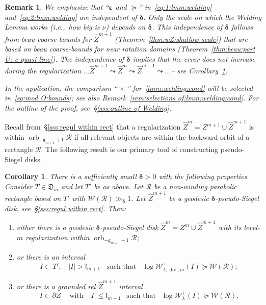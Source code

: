 \documentclass{amsart}
\renewcommand{\sp}{{\ \ }}
\newcommand{\1}{{\mathbb 1 }}
\renewcommand{\div}{{\operatorname{div}}}
\newcommand{\Width}{{\mathcal W}}
\newcommand\RR{\mathcal{R}}
\newcommand{\wZ}{{\widehat Z}}
\newcommand{\qq}{\mathfrak{q}}
\newcommand{\length}{{\mathfrak l}}
\newcommand{\Dbb}{{\mathfrak{D}}}
\newtheorem{cor}[thm]{Corollary}
\newtheorem{rem}[thm]{Remark}
\theoremstyle{remark}
\numberwithin{equation}{section}
\theoremstyle{definition}
\newcommand{\orb}{\operatorname{orb}}
\newcommand{\bdelta}{{\boldsymbol{ \delta}}}
\newcommand{\bvarepsilon}{{\boldsymbol{ \varepsilon}}}
\begin{document}
\begin{rem}
\label{rem:error does not accum}
We emphasize that ``$\bvarepsilon$ and $\succeq$'' in~\eqref{eq:1:lmm:welding} and~\eqref{eq:2:lmm:welding} are independent of $\bdelta$. Only the scale on which the Welding Lemma works  (i.e.,~how big is $\nu$) depends on $\bdelta$. This independence of $\bdelta$ follows from beau coarse-bounds for $\wZ^{m+1}$ (Theorem~\ref{thm:wZ:shallow scale}) that are based on beau coarse-bounds for near rotation domains (Theorem~\ref{thm:beau:part U: c quasi line}). The independence of $\bdelta$ implies that the error does not increase during the regularization $\dots \wZ^{m+1}\leadsto \wZ^{m} \leadsto\wZ^{m-1}\leadsto\dots$-- see Corollary~\ref{cor:regul}.

In the application, the comparison ``$\asymp$'' for~\eqref{lmm:welding:cond} will be selected in~\eqref{eq:mod O:bounds}; see also Remark~\ref{rem:selections of:lmm:welding:cond}. For the outline of the proof, see~\S\ref{sss:outline of Welding}. 
\end{rem}


Recall from~\S\ref{sss:regul within rect} that a regularization $\wZ^{m}=Z^{m+1}\cup \wZ^{m+1}$ is within $\orb_{-\qq_{m+1}+1} \RR$ if all relevant objects are within the backward orbit of a rectangle $\RR$. The following result is our primary tool of constructing pseudo-Siegel disks.
    
    
\begin{cor}
\label{cor:regul}
There is a sufficiently small $\bdelta>0$ with the following properties. Consider $T\in \Dbb_m$ and let $T'$ be as above. Let $\RR$ be a non-winding parabolic rectangle based on $T'$ with $\Width(\RR)\gg_{\bdelta} 1$. Let $\wZ^{m+1}$ be a geodesic $\bdelta$-pseudo-Siegel disk, see~\S\ref{sss:regul within rect}. Then:
\begin{enumerate}
\item either there is a geodesic $\bdelta$-pseudo-Siegel disk $\wZ^m=Z^m\cup \wZ^{m+1}$ with its level-$m$ regularization within $\orb_{-\qq_{m+1}+1} \RR$;
\label{case:1:thm:regul}
\item or there is an interval \[I\subset T',\sp\sp   |I|> \length_{m+1} \sp\sp \text{such that}\sp\sp 
\log \Width^{+}_{\lambda,\div, m}(I)\succeq \Width(\RR);
\]\label{case:2:thm:regul}
\item or there is a grounded rel $\wZ^{m+1}$ interval \[I\subset \partial Z\sp\sp \text{ with }\sp |I|\le \length_{m+1} \sp \text{ such that }\sp\log \Width^+_\lambda(I)\succeq  \Width(\RR).\]
\label{case:3:thm:regul}
\end{enumerate}  
\end{cor}
 
\end{document}
